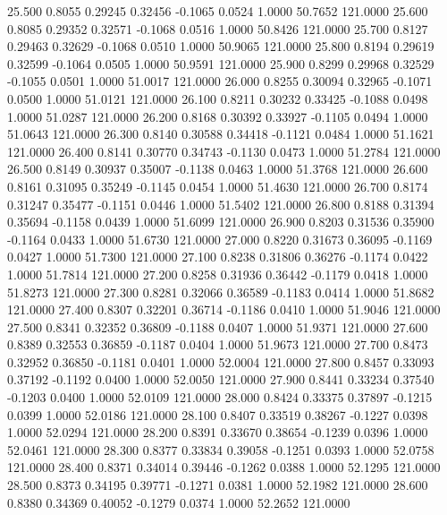   25.500   0.8055   0.29245   0.32456  -0.1065   0.0524   1.0000  50.7652 121.0000
  25.600   0.8085   0.29352   0.32571  -0.1068   0.0516   1.0000  50.8426 121.0000
  25.700   0.8127   0.29463   0.32629  -0.1068   0.0510   1.0000  50.9065 121.0000
  25.800   0.8194   0.29619   0.32599  -0.1064   0.0505   1.0000  50.9591 121.0000
  25.900   0.8299   0.29968   0.32529  -0.1055   0.0501   1.0000  51.0017 121.0000
  26.000   0.8255   0.30094   0.32965  -0.1071   0.0500   1.0000  51.0121 121.0000
  26.100   0.8211   0.30232   0.33425  -0.1088   0.0498   1.0000  51.0287 121.0000
  26.200   0.8168   0.30392   0.33927  -0.1105   0.0494   1.0000  51.0643 121.0000
  26.300   0.8140   0.30588   0.34418  -0.1121   0.0484   1.0000  51.1621 121.0000
  26.400   0.8141   0.30770   0.34743  -0.1130   0.0473   1.0000  51.2784 121.0000
  26.500   0.8149   0.30937   0.35007  -0.1138   0.0463   1.0000  51.3768 121.0000
  26.600   0.8161   0.31095   0.35249  -0.1145   0.0454   1.0000  51.4630 121.0000
  26.700   0.8174   0.31247   0.35477  -0.1151   0.0446   1.0000  51.5402 121.0000
  26.800   0.8188   0.31394   0.35694  -0.1158   0.0439   1.0000  51.6099 121.0000
  26.900   0.8203   0.31536   0.35900  -0.1164   0.0433   1.0000  51.6730 121.0000
  27.000   0.8220   0.31673   0.36095  -0.1169   0.0427   1.0000  51.7300 121.0000
  27.100   0.8238   0.31806   0.36276  -0.1174   0.0422   1.0000  51.7814 121.0000
  27.200   0.8258   0.31936   0.36442  -0.1179   0.0418   1.0000  51.8273 121.0000
  27.300   0.8281   0.32066   0.36589  -0.1183   0.0414   1.0000  51.8682 121.0000
  27.400   0.8307   0.32201   0.36714  -0.1186   0.0410   1.0000  51.9046 121.0000
  27.500   0.8341   0.32352   0.36809  -0.1188   0.0407   1.0000  51.9371 121.0000
  27.600   0.8389   0.32553   0.36859  -0.1187   0.0404   1.0000  51.9673 121.0000
  27.700   0.8473   0.32952   0.36850  -0.1181   0.0401   1.0000  52.0004 121.0000
  27.800   0.8457   0.33093   0.37192  -0.1192   0.0400   1.0000  52.0050 121.0000
  27.900   0.8441   0.33234   0.37540  -0.1203   0.0400   1.0000  52.0109 121.0000
  28.000   0.8424   0.33375   0.37897  -0.1215   0.0399   1.0000  52.0186 121.0000
  28.100   0.8407   0.33519   0.38267  -0.1227   0.0398   1.0000  52.0294 121.0000
  28.200   0.8391   0.33670   0.38654  -0.1239   0.0396   1.0000  52.0461 121.0000
  28.300   0.8377   0.33834   0.39058  -0.1251   0.0393   1.0000  52.0758 121.0000
  28.400   0.8371   0.34014   0.39446  -0.1262   0.0388   1.0000  52.1295 121.0000
  28.500   0.8373   0.34195   0.39771  -0.1271   0.0381   1.0000  52.1982 121.0000
  28.600   0.8380   0.34369   0.40052  -0.1279   0.0374   1.0000  52.2652 121.0000
